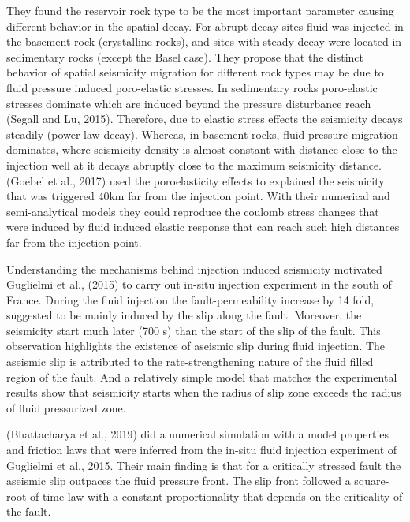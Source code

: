 \documentclass[draft,jgrga]{agutexSI2019}
\begin{document}
\begin{article}
They found the reservoir rock type to be the most important parameter causing different behavior in the spatial decay. For abrupt decay sites fluid was injected in the basement rock (crystalline rocks), and sites with steady decay were located in sedimentary rocks (except the Basel case). They propose that the distinct behavior of spatial seismicity migration for different rock types may be due to fluid pressure induced poro-elastic stresses. In sedimentary rocks poro-elastic stresses dominate which are induced beyond the pressure disturbance reach (Segall and Lu, 2015). Therefore, due to elastic stress effects the seismicity decays steadily (power-law decay). Whereas, in basement rocks, fluid pressure migration dominates, where seismicity density is almost constant with distance close to the injection well at it decays abruptly close to the maximum seismicity distance. (Goebel et al., 2017) used the poroelasticity effects to explained the seismicity that was triggered 40km far from the injection point. With their numerical and semi-analytical models they could reproduce the coulomb stress changes that were induced by fluid induced elastic response that can reach such high distances far from the injection point.

Understanding the mechanisms behind injection induced seismicity motivated Guglielmi et al., (2015) to carry out in-situ injection experiment in the south of France. During the fluid injection the fault-permeability increase by 14 fold, suggested to be mainly induced by the slip along the fault. Moreover, the seismicity start much later (700 s) than the start of the slip of the fault. This observation highlights the existence of aseismic slip during fluid injection. The aseismic slip is attributed to the rate-strengthening nature of the fluid filled region of the fault. And a relatively simple model that matches the experimental results show that seismicity starts when the radius of slip zone exceeds the radius of fluid pressurized zone.

(Bhattacharya et al., 2019) did a numerical simulation with a model properties and friction laws that were inferred from the in-situ fluid injection experiment of Guglielmi et al., 2015. Their main finding is that for a critically stressed fault the aseismic slip outpaces the fluid pressure front. The slip front followed a square-root-of-time law with a constant proportionality that depends on the criticality of the fault.


\end{article}
\end{document}

